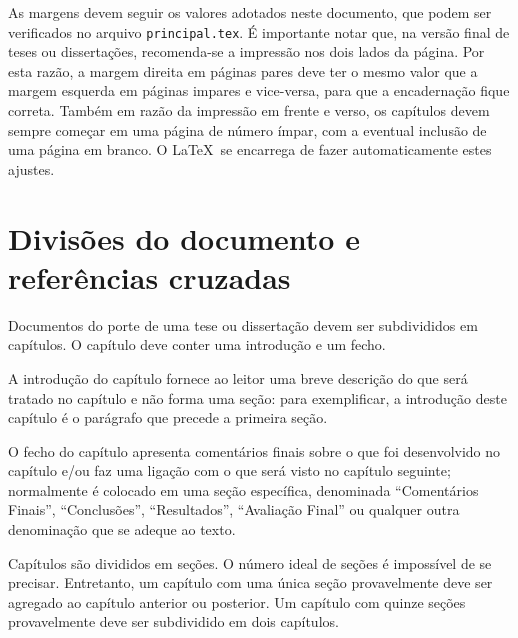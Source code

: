 As margens devem seguir os valores adotados neste documento, que podem
ser verificados no arquivo \texttt{principal.tex}. É importante notar
que, na versão final de teses ou dissertações, recomenda-se a
impressão nos dois lados da página. Por esta razão, a margem direita
em páginas pares deve ter o mesmo valor que a margem esquerda em
páginas impares e vice-versa, para que a encadernação fique
correta. Também em razão da impressão em frente e verso, os capítulos
devem sempre começar em uma página de número ímpar, com a eventual
inclusão de uma página em branco. O \LaTeX\ se encarrega de fazer
automaticamente estes ajustes.

\section{Divisões do documento e referências cruzadas}
\label{Sec:divisoes}

Documentos do porte de uma tese ou dissertação devem ser subdivididos
em capítulos. O capítulo deve conter uma introdução e um fecho.

A introdução do capítulo fornece ao leitor uma breve descrição do que
será tratado no capítulo e não forma uma seção: para exemplificar, a
introdução deste capítulo é o parágrafo que precede a primeira seção.

O fecho do capítulo apresenta comentários finais sobre o que foi
desenvolvido no capítulo e/ou faz uma ligação com o que será visto no
capítulo seguinte; normalmente é colocado em uma seção específica,
denominada ``Comentários Finais'', ``Conclusões'', ``Resultados'',
``Avaliação Final'' ou qualquer outra denominação que se adeque ao
texto.

Capítulos são divididos em seções. O número ideal de seções é
impossível de se precisar. Entretanto, um capítulo com uma única seção
provavelmente deve ser agregado ao capítulo anterior ou posterior. Um
capítulo com quinze seções provavelmente deve ser subdividido em dois
capítulos.

